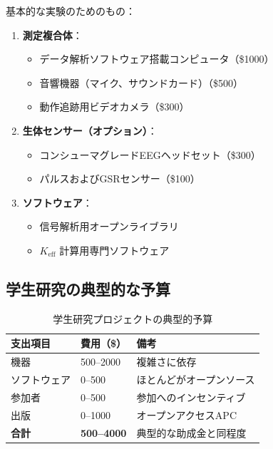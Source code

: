 \documentclass[12pt,a4paper]{article}
\begin{document}
	基本的な実験のためのもの：
	\begin{enumerate}
		\item \textbf{測定複合体}：
		\begin{itemize}
			\item データ解析ソフトウェア搭載コンピュータ（\$1000）
			\item 音響機器（マイク、サウンドカード）（\$500）
			\item 動作追跡用ビデオカメラ（\$300）
		\end{itemize}
		
		\item \textbf{生体センサー（オプション）}：
		\begin{itemize}
			\item コンシューマグレードEEGヘッドセット（\$300）
			\item パルスおよびGSRセンサー（\$100）
		\end{itemize}
		
		\item \textbf{ソフトウェア}：
		\begin{itemize}
			\item 信号解析用オープンライブラリ
			\item \(K_{\mathrm{eff}}\) 計算用専門ソフトウェア
		\end{itemize}
	\end{enumerate}
	
	\subsection{学生研究の典型的な予算}
	
	\begin{table}[h]
		\centering
		\begin{tabular}{p{}p{}p{}}
			\toprule
			\textbf{支出項目} & \textbf{費用（\$）} & \textbf{備考} \\
			\midrule
			機器 & 500–2000 & 複雑さに依存 \\
			ソフトウェア & 0–500 & ほとんどがオープンソース \\
			参加者 & 0–500 & 参加へのインセンティブ \\
			出版 & 0–1000 & オープンアクセスAPC \\
			\midrule
			\textbf{合計} & \textbf{500–4000} & 典型的な助成金と同程度 \\
			\bottomrule
		\end{tabular}
		\caption{学生研究プロジェクトの典型的予算}
		\label{tab:student-budget}
	\end{table}
	
\end{document}
